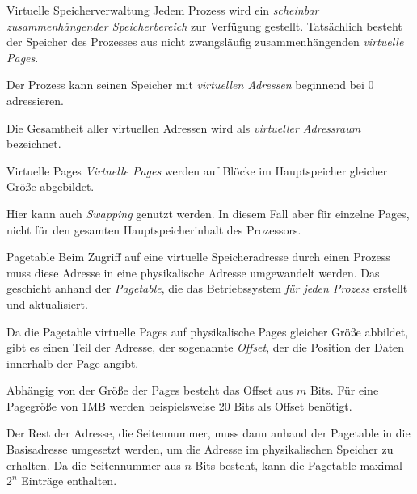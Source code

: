 \documentclass[german]{spicker}
\begin{document}
\begin{defi}{Virtuelle Speicherverwaltung}
    Jedem Prozess wird ein \emph{scheinbar zusammenhängender Speicherbereich} zur Verfügung gestellt.
    Tatsächlich besteht der Speicher des Prozesses aus nicht zwangsläufig zusammenhängenden \emph{virtuelle Pages}.

    Der Prozess kann seinen Speicher mit \emph{virtuellen Adressen} beginnend bei 0 adressieren.

    Die Gesamtheit aller virtuellen Adressen wird als \emph{virtueller Adressraum} bezeichnet.
\end{defi}

\begin{defi}{Virtuelle Pages}
    \emph{Virtuelle Pages} werden auf Blöcke im Hauptspeicher gleicher Größe abgebildet.

    Hier kann auch \emph{Swapping} genutzt werden. In diesem Fall aber für einzelne Pages, nicht für den gesamten Hauptspeicherinhalt des Prozessors.
\end{defi}

\begin{defi}{Pagetable}
    Beim Zugriff auf eine virtuelle Speicheradresse durch einen Prozess muss diese
    Adresse in eine physikalische Adresse umgewandelt werden. Das geschieht anhand
    der \emph{Pagetable}, die das Betriebssystem \emph{für jeden Prozess} erstellt und aktualisiert.

    Da
    die Pagetable virtuelle Pages auf physikalische Pages gleicher Größe abbildet, gibt es einen Teil der Adresse, der sogenannte \emph{Offset}, der die Position der Daten innerhalb
    der Page angibt.

    Abhängig von
    der Größe der Pages besteht das Offset aus $m$ Bits.
    Für eine Pagegröße von 1MB
    werden beispielsweise 20 Bits als Offset benötigt.

    Der Rest der Adresse, die Seitennummer,
    muss dann anhand der Pagetable in die Basisadresse umgesetzt werden,
    um die Adresse im physikalischen Speicher zu erhalten. Da die Seitennummer aus
    $n$ Bits besteht, kann die Pagetable maximal $2^n$ Einträge enthalten.
\end{defi}
\end{document}
